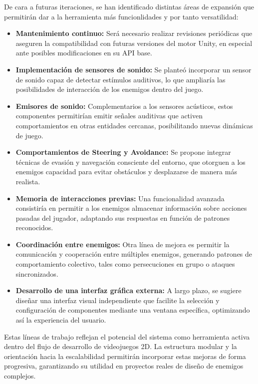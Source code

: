 De cara a futuras iteraciones, se han identificado distintas áreas de expansión que permitirán dar a la herramienta más funcionlidades y por tanto versatilidad:\\
\begin{itemize}
  \item \textbf{Mantenimiento continuo:}  Será necesario realizar revisiones periódicas que aseguren la compatibilidad con futuras versiones del motor Unity, en especial ante posibles modificaciones en su API base.
  \item \textbf{Implementación de sensores de sonido:}  Se planteó incorporar un sensor de sonido capaz de detectar estímulos auditivos, lo que ampliaría las posibilidades de interacción de los enemigos dentro del juego.
  \item \textbf{Emisores de sonido:}  Complementarios a los sensores acústicos, estos componentes permitirían emitir señales auditivas que activen comportamientos en otras entidades cercanas, posibilitando nuevas dinámicas de juego.
  \item \textbf{Comportamientos de Steering y Avoidance: }  Se propone integrar técnicas de evasión y navegación consciente del entorno, que otorguen a los enemigos capacidad para evitar obstáculos y desplazarse de manera más realista.
  \item \textbf{Memoria de interacciones previas: }Una funcionalidad avanzada consistiría en permitir a los enemigos almacenar información sobre acciones pasadas del jugador, adaptando sus respuestas en función de patrones reconocidos.
\item \textbf{Coordinación entre enemigos:}   Otra línea de mejora es permitir la comunicación y cooperación entre múltiples enemigos, generando patrones de comportamiento colectivo, tales como persecuciones en grupo o ataques sincronizados.
 \item \textbf{Desarrollo de una interfaz gráfica externa: }  A largo plazo, se sugiere diseñar una interfaz visual independiente que facilite la selección y configuración de componentes mediante una ventana específica, optimizando así la experiencia del usuario.
\end{itemize}

Estas líneas de trabajo reflejan el potencial del sistema como herramienta activa dentro del flujo de desarrollo de videojuegos 2D. La estructura modular y la orientación hacia la escalabilidad permitirán incorporar estas mejoras de forma progresiva, garantizando su utilidad en proyectos reales de diseño de enemigos complejos.